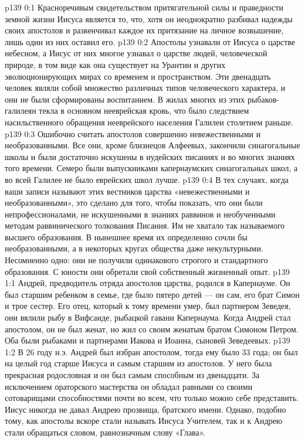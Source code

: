\author{Комиссия срединников}
\vs p139 0:1 Красноречивым свидетельством притягательной силы и праведности земной жизни Иисуса является то, что, хотя он неоднократно разбивал надежды своих апостолов и развенчивал каждое их притязание на личное возвышение, лишь один из них оставил его.
\vs p139 0:2 Апостолы узнавали от Иисуса о царстве небесном, а Иисус от них многое узнавал о царстве людей, человеческой природе, в том виде как она существует на Урантии и других эволюционирующих мирах со временем и пространством. Эти двенадцать человек являли собой множество различных типов человеческого характера, и они не были сформированы  воспитанием. В жилах многих из этих рыбаков\hyp{}галилеян текла в основном нееврейская кровь, что было следствием насильственного обращения нееврейского населения Галилеи столетием раньше.
\vs p139 0:3 \pc Ошибочно считать апостолов совершенно невежественными и необразованными. Все они, кроме близнецов Алфеевых, закончили синагогальные школы и были достаточно искушены в иудейских писаниях и во многих знаниях того времени. Семеро были выпускниками капернаумских синагогальных школ, а во всей Галилее не было еврейских школ лучше.
\vs p139 0:4 В тех случаях, когда ваши записи называют этих вестников царства «невежественными и необразованными», это сделано для того, чтобы показать, что они были непрофессионалами, не искушенными в знаниях раввинов и необученными методам раввинического толкования Писания. Им не хватало так называемого высшего образования. В нынешнее время их определенно сочли бы необразованными, а в некоторых кругах общества даже некультурными. Несомненно одно: они не получили одинакового строгого и стандартного образования. С юности они обретали свой собственный жизненный опыт.
\vs p139 1:1 Андрей, предводитель отряда апостолов царства, родился в Капернауме. Он был старшим ребенком в семье, где было пятеро детей --- он сам, его брат Симон и трое сестер. Его отец, который к тому времени умер, был партнером Зеведея, они вялили рыбу в Вифсаиде, рыбацкой гавани Капернаума. Когда Андрей стал апостолом, он не был женат, но жил со своим женатым братом Симоном Петром. Оба были рыбаками и партнерами Иакова и Иоанна, сыновей Зеведеевых.
\vs p139 1:2 В 26 году н.э. Андрей был избран апостолом, тогда ему было 33 года; он был на целый год старше Иисуса и самым старшим из апостолов. У него была прекрасная родословная и он был самым способным из двенадцати. За исключением ораторского мастерства он обладал равными со своими сотоварищами способностями почти во всем, что только можно себе представить. Иисус никогда не давал Андрею прозвища, братского имени. Однако, подобно тому, как апостолы вскоре стали называть Иисуса Учителем, так и к Андрею стали обращаться словом, равнозначным слову «Глава».
